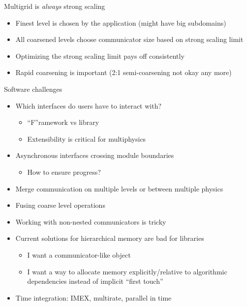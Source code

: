 \documentclass{beamer}
\begin{document}
\begin{frame}{Multigrid is \emph{always} strong scaling}
  \begin{itemize}
  \item Finest level is chosen by the application (might have big subdomains)
  \item All coarsened levels choose communicator size based on strong scaling limit
  \item Optimizing the strong scaling limit pays off consistently
  \item Rapid coarsening is important (2:1 semi-coarsening not okay any more)
  \end{itemize}
\end{frame}

\begin{frame}{Software challenges}
  \begin{itemize}
  \item Which interfaces do users have to interact with?
    \begin{itemize}
    \item ``F''ramework vs library
    \item Extensibility is critical for multiphysics
    \end{itemize}
  \item Asynchronous interfaces crossing module boundaries
    \begin{itemize}
    \item How to ensure progress?
    \end{itemize}
  \item Merge communication on multiple levels or between multiple physics
  \item Fusing coarse level operations
  \item Working with non-nested communicators is tricky
  \item Current solutions for hierarchical memory are bad for libraries
    \begin{itemize}
    \item I want a communicator-like object
    \item I want a way to allocate memory explicitly/relative to algorithmic dependencies instead of implicit ``first touch''
    \end{itemize}
  \item Time integration: IMEX, multirate, parallel in time
  \end{itemize}
\end{frame}
\end{document}
